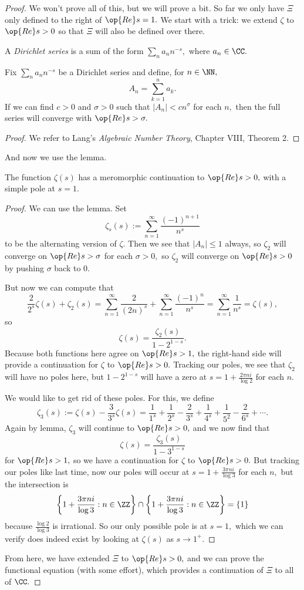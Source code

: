 \documentclass[../notes.tex]{subfiles}
\begin{document}
\begin{proof}
	We won't prove all of this, but we will prove a bit. So far we only have $\Xi$ only defined to the right of $\op{Re}s=1.$ We start with a trick: we extend $\zeta$ to $\op{Re}s>0$ so that $\Xi$ will also be defined over there.
	\begin{definition}
		A \textit{Dirichlet series} is a sum of the form $\sum_na_nn^{-s},$ where $a_n\in\CC.$
	\end{definition}
	\begin{lemma}
		Fix $\sum_na_nn^{-s}$ be a Dirichlet series and define, for $n\in\NN,$
		\[A_n=\sum_{k=1}^na_k.\]
		If we can find $c>0$ and $\sigma>0$ such that $|A_n|<cn^\sigma$ for each $n,$ then the full series will converge with $\op{Re}s>\sigma.$
	\end{lemma}
	\begin{proof}
		We refer to Lang's \textit{Algebraic Number Theory}, Chapter VIII, Theorem 2.
	\end{proof}
	And now we use the lemma.
	\begin{prop}
		The function $\zeta(s)$ has a meromorphic continuation to $\op{Re}s>0,$ with a simple pole at $s=1.$
	\end{prop}
	\begin{proof}
		We can use the lemma. Set
		\[\zeta_s(s):=\sum_{n=1}^\infty\frac{(-1)^{n+1}}{n^s}\]
		to be the alternating version of $\zeta.$ Then we see that $|A_n|\le1$ always, so $\zeta_2$ will converge on $\op{Re}s>\sigma$ for each $\sigma>0,$ so $\zeta_2$ will converge on $\op{Re}s>0$ by pushing $\sigma$ back to $0.$

		But now we can compute that
		\[\frac2{2^s}\zeta(s)+\zeta_2(s)=\sum_{n=1}^\infty\frac{2}{(2n)^s}+\sum_{n=1}^\infty\frac{(-1)^n}{n^s}=\sum_{n=1}^\infty\frac1{n^s}=\zeta(s),\]
		so
		\[\zeta(s)=\frac{\zeta_2(s)}{1-2^{1-s}}.\]
		Because both functions here agree on $\op{Re}s>1,$ the right-hand side will provide a continuation for $\zeta$ to $\op{Re}s>0.$	Tracking our poles, we see that $\zeta_2$ will have no poles here, but $1-2^{1-s}$ will have a zero at $s=1+\frac{2\pi ni}{\log2}$ for each $n.$

		We would like to get rid of these poles. For this, we define
		\[\zeta_3(s):=\zeta(s)-\frac3{3^s}\zeta(s)=\frac1{1^s}+\frac1{2^s}-\frac{2}{3^s}+\frac1{4^s}+\frac1{5^2}-\frac{2}{6^s}+\cdots.\]
		Again by lemma, $\zeta_3$ will continue to $\op{Re}s>0,$ and we now find that
		\[\zeta(s)=\frac{\zeta_3(s)}{1-3^{1-s}}\]
		for $\op{Re}s>1,$ so we have a continuation for $\zeta$ to $\op{Re}s>0.$ But tracking our poles like last time, now our poles will occur at $s=1+\frac{3\pi ni}{\log3}$ for each $n,$ but the intersection is
		\[\left\{1+\frac{3\pi ni}{\log3}:n\in\ZZ\right\}\cap\left\{1+\frac{3\pi ni}{\log3}:n\in\ZZ\right\}=\{1\}\]
		because $\frac{\log2}{\log3}$ is irrational. So our only possible pole is at $s=1,$ which we can verify does indeed exist by looking at $\zeta(s)$ as $s\to1^+.$
	\end{proof}
	From here, we have extended $\Xi$ to $\op{Re}s>0,$ and we can prove the functional equation (with some effort), which provides a continuation of $\Xi$ to all of $\CC.$
\end{proof}
\end{document}
